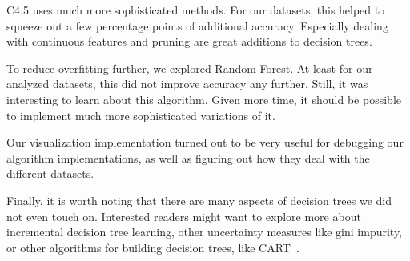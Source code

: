 \documentclass[a4paper]{article}
\begin{document}
C4.5 uses much more sophisticated methods. For our datasets, this helped to squeeze out a few percentage points of additional accuracy. Especially dealing with continuous features and pruning are great additions to decision trees.

To reduce overfitting further, we explored Random Forest. At least for our analyzed datasets, this did not improve accuracy any further. Still, it was interesting to learn about this algorithm. Given more time, it should be possible to implement much more sophisticated variations of it.

Our visualization implementation turned out to be very useful for debugging our algorithm implementations, as well as figuring out how they deal with the different datasets.

Finally, it is worth noting that there are many aspects of decision trees we did not even touch on. Interested readers might want to explore more about incremental decision tree learning, other uncertainty measures like gini impurity, or other algorithms for building decision trees, like CART~\cite{friedman2001elements}.



\end{document}
